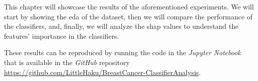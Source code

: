 This chapter will showcase the results of the aforementioned experiments. We will start by showing the \acl{eda} of the dataset, then we will compare the performance of the classifiers, and, finally, we will analyze the \ac{shap} values to understand the features' importance in the classifiers.

These results can be reproduced by running the code in the \textit{Jupyter Notebook} that is available in the \textit{GitHub} repository \href{https://github.com/LittleHaku/BreastCancer-ClassifierAnalysis}{https://github.com/LittleHaku/BreastCancer-ClassifierAnalysis}.
